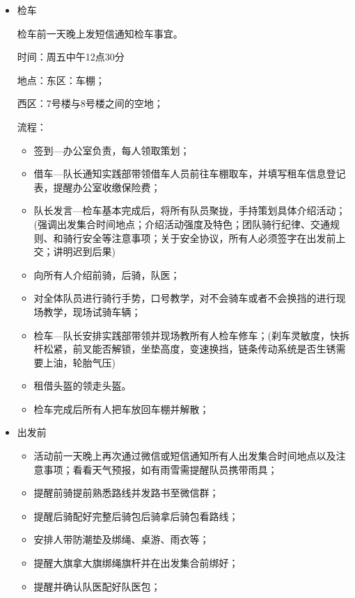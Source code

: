 \documentclass{ctexbook}
\begin{document}
\begin{itemize}
    \item 检车

检车前一天晚上发短信通知检车事宜。


时间：周五中午12点30分

地点：东区：车棚；

      西区：7号楼与8号楼之间的空地；

流程：
    \begin{itemize}
        \item 签到—办公室负责，每人领取策划；
        \item 借车—队长通知实践部带领借车人员前往车棚取车，并填写租车信息登记表，提醒办公室收缴保险费；
        \item 队长发言—检车基本完成后，将所有队员聚拢，手持策划具体介绍活动；(强调出发集合时间地点；介绍活动强度及特色；团队骑行纪律、交通规则、和骑行安全等注意事项；关于安全协议，所有人必须签字在出发前上交；讲明迟到后果)
        \item 向所有人介绍前骑，后骑，队医；
        \item 对全体队员进行骑行手势，口号教学，对不会骑车或者不会换挡的进行现场教学，现场试骑车辆；
        \item 检车—队长安排实践部带领并现场教所有人检车修车；(刹车灵敏度，快拆杆松紧，前叉能否解锁，坐垫高度，变速换挡，链条传动系统是否生锈需要上油，轮胎气压)
        \item 租借头盔的领走头盔。

        \item 检车完成后所有人把车放回车棚并解散；
    \end{itemize}

    \item 出发前
    \begin{itemize}
        \item 活动前一天晚上再次通过微信或短信通知所有人出发集合时间地点以及注意事项；看看天气预报，如有雨雪需提醒队员携带雨具；

        \item 提醒前骑提前熟悉路线并发路书至微信群；

        \item 提醒后骑配好完整后骑包后骑拿后骑包看路线；

        \item 安排人带防潮垫及绑绳、桌游、雨衣等；

        \item 提醒大旗拿大旗绑绳旗杆并在出发集合前绑好；

        \item 提醒并确认队医配好队医包；
    \end{itemize}
\end{itemize}
\end{document}
